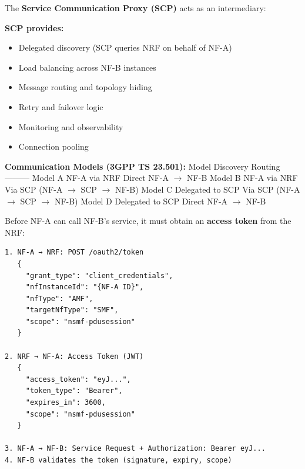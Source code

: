 
The \textbf{Service Communication Proxy (SCP)} acts as an intermediary:


\textbf{SCP provides:}

\begin{itemize}
\tightlist
\item
  Delegated discovery (SCP queries NRF on behalf of NF-A)
\item
  Load balancing across NF-B instances
\item
  Message routing and topology hiding
\item
  Retry and failover logic
\item
  Monitoring and observability
\item
  Connection pooling
\end{itemize}

\textbf{Communication Models (3GPP TS 23.501):}\CNbr{}\textbar{} Model \textbar{} Discovery \textbar{} Routing \textbar{}\CNbr{}\textbar{}—\textbar{}—\textbar{}—\textbar{}\CNbr{}\textbar{} Model A \textbar{} NF-A via NRF \textbar{} Direct NF-A \ensuremath{\to} NF-B \textbar{}\CNbr{}\textbar{} Model B \textbar{} NF-A via NRF \textbar{} Via SCP (NF-A \ensuremath{\to} SCP \ensuremath{\to} NF-B) \textbar{}\CNbr{}\textbar{} Model C \textbar{} Delegated to SCP \textbar{} Via SCP (NF-A \ensuremath{\to} SCP \ensuremath{\to} NF-B) \textbar{}\CNbr{}\textbar{} Model D \textbar{} Delegated to SCP \textbar{} Direct NF-A \ensuremath{\to} NF-B \textbar{}




\CNchained{}



Before NF-A can call NF-B’s service, it must obtain an \textbf{access token} from the NRF:

\def\CNcodelang{}

\begin{CNplaincode}
\begin{Verbatim}
1. NF-A → NRF: POST /oauth2/token
   {
     "grant_type": "client_credentials",
     "nfInstanceId": "{NF-A ID}",
     "nfType": "AMF",
     "targetNfType": "SMF",
     "scope": "nsmf-pdusession"
   }
   
2. NRF → NF-A: Access Token (JWT)
   {
     "access_token": "eyJ...",
     "token_type": "Bearer",
     "expires_in": 3600,
     "scope": "nsmf-pdusession"
   }

3. NF-A → NF-B: Service Request + Authorization: Bearer eyJ...
4. NF-B validates the token (signature, expiry, scope)
\end{Verbatim}
\end{CNplaincode}

